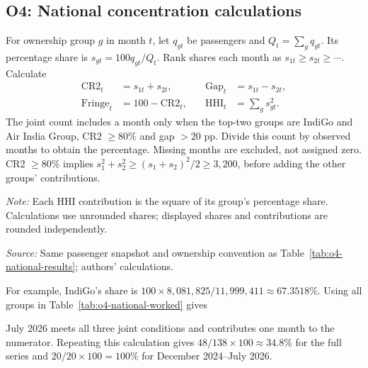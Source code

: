 \documentclass[12pt,a4paper]{article}
\begin{document}
\subsection{O4: National concentration calculations}
\label{app:o4-national-calculations}
For ownership group $g$ in month $t$, let $q_{gt}$ be passengers and $Q_t=\sum_g q_{gt}$. Its percentage share is $s_{gt}=100q_{gt}/Q_t$. Rank shares each month as $s_{1t}\geq s_{2t}\geq\cdots$. Calculate
\[
\begin{aligned}
\mathrm{CR2}_t&=s_{1t}+s_{2t}, &\quad \mathrm{Gap}_t&=s_{1t}-s_{2t},\\
\mathrm{Fringe}_t&=100-\mathrm{CR2}_t, &\quad \mathrm{HHI}_t&=\sum_g s_{gt}^{2}.
\end{aligned}
\]
The joint count includes a month only when the top-two groups are IndiGo and Air India Group, CR2 $\geq80\%$ and gap $>20$ pp. Divide this count by observed months to obtain the percentage. Missing months are excluded, not assigned zero. CR2 $\geq80\%$ implies $s_1^2+s_2^2\geq(s_1+s_2)^2/2\geq3{,}200$, before adding the other groups' contributions.

\begin{minipage}{\linewidth}
\captionsetup{font=small,labelfont=bf,justification=raggedright,singlelinecheck=false,hypcap=false}
\label{tab:o4-national-worked}
\centering
{\small{}\par}
\vspace{4pt}
{\footnotesize{}\raggedright\textit{Note:} Each HHI contribution is the square of its group's percentage share. Calculations use unrounded shares; displayed shares and contributions are rounded independently.\par
\textit{Source:} Same passenger snapshot and ownership convention as Table~\ref{tab:o4-national-results}; authors' calculations.\par}
\end{minipage}

For example, IndiGo's share is $100\times8{,}081{,}825/11{,}999{,}411\approx67.3518\%$. Using all groups in Table~\ref{tab:o4-national-worked} gives

July 2026 meets all three joint conditions and contributes one month to the numerator. Repeating this calculation gives $48/138\times100\approx34.8\%$ for the full series and $20/20\times100=100\%$ for December 2024--July 2026.
\end{document}
